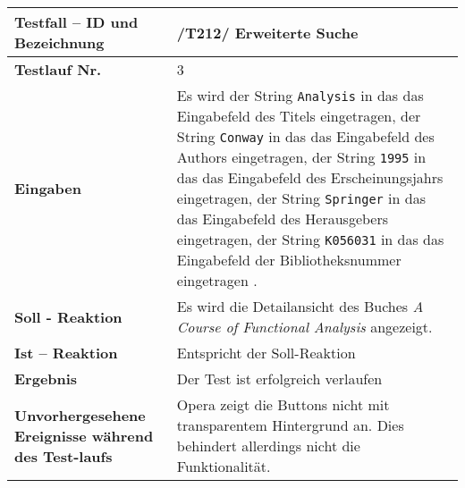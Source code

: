 \begin{longtable}{|p{5cm}|p{10cm}|}
\hline
\textbf{Testfall -- ID und Bezeichnung} & \textnormal{/T212/ Erweiterte
Suche} \\
\hline
\textbf{Testlauf Nr.} & \textnormal{3} \\
\hline
\textbf{Eingaben} & \textnormal{Es wird 
der String \lstinline{Analysis} in das das Eingabefeld des Titels eingetragen,
der String \lstinline{Conway} in das das Eingabefeld des Authors eingetragen,
der String \lstinline{1995} in das das Eingabefeld des Erscheinungsjahrs
eingetragen,
der String \lstinline{Springer} in das das Eingabefeld des Herausgebers
eingetragen,
der String \lstinline{K056031} in das das Eingabefeld der Bibliotheksnummer eingetragen
.} \\
\hline
\textbf{Soll - Reaktion} & \textnormal{Es wird die Detailansicht des Buches \textit{A
Course of Functional Analysis} angezeigt.} \\
\hline
\textbf{Ist -- Reaktion} & \textnormal{Entspricht der Soll-Reaktion} \\
\hline
\textbf{Ergebnis} & \textnormal{Der Test ist erfolgreich verlaufen} \\
\hline
\textbf{Unvorhergesehene Ereignisse w\"ahrend des Test-laufs } &
\textnormal{Opera zeigt die Buttons nicht mit transparentem Hintergrund an. Dies
behindert allerdings nicht die Funktionalität.} \\
\hline
\end{longtable}
